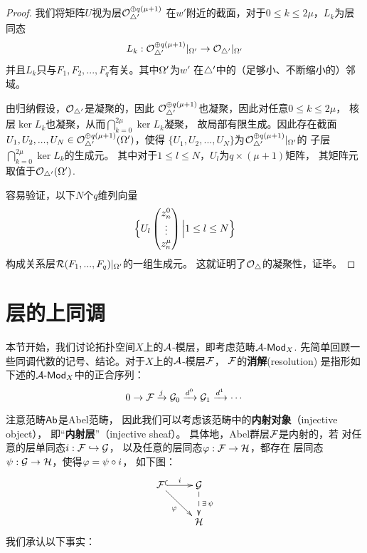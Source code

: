 \begin{proof}
我们将矩阵$U$视为层$\mathcal{O}_{\triangle'}^{\oplus q(\mu+1)}$
在$w'$附近的截面，对于$0\leq k\leq2\mu$，$L_k$为层同态
$$
  L_k:\mathcal{O}_{\triangle'}^{\oplus q(\mu+1)}|_{\Omega'}
\to
  \mathcal{O}_{\triangle'}|_{\Omega'}
$$
并且$L_k$只与$F_1,F_2,...,F_q$有关。其中$\Omega'$为$w'$
在$\triangle'$中的（足够小、不断缩小的）邻域。\vs

由归纳假设，$\mathcal{O}_{\triangle'}$是凝聚的，因此
$\mathcal{O}_{\triangle'}^{\oplus q(\mu+1)}$也凝聚，因此对任意$0\leq k\leq 2\mu$，
核层$\ker L_k$也凝聚，从而$\bigcap\limits_{k=0}^{2\mu}\ker L_k$凝聚，
故局部有限生成。因此存在截面
$U_1,U_2,...,U_N\in\mathcal{O}_{\triangle'}^{\oplus q(\mu+1)}(\Omega')$，使得
$\{U_1,U_2,...,U_N\}$为$\mathcal{O}_{\triangle'}^{\oplus q(\mu+1)}|_{\Omega'}$的
子层$\bigcap\limits_{k=0}^{2\mu}\ker L_k$的生成元。
其中对于$1\leq l\leq N$，$U_l$为$q\times(\mu+1)$矩阵，
其矩阵元取值于$\mathcal{O}_{\triangle'}(\Omega')$.

容易验证，以下$N$个$q$维列向量
$$
  \Big\{ U_l
           \begin{pmatrix}
             z_n^0  \\
             \vdots \\
             z_n^\mu
           \end{pmatrix}
          \Big| 1\leq l\leq N \Big\}
$$
构成关系层$\mathcal{R}(F_1,...,F_q)|_{\Omega'}$的一组生成元。
这就证明了$\mathcal{O}_{\triangle}$的凝聚性，证毕。
\end{proof}


\section{层的上同调}

本节开始，我们讨论拓扑空间$X$上的$\mathcal{A}$-模层，即考虑范畴$\mathcal{A}\operatorname{\!\text{-}\mathsf{Mod}}_X$.
先简单回顾一些同调代数的记号、结论。对于$X$上的$\mathcal{A}$-模层$\mathcal{F}$，
$\mathcal{F}$的\textbf{消解}(resolution)
是指形如下述的$\mathcal{A}\operatorname{\!\text{-}\mathsf{Mod}}_X$中的正合序列：
$$
0\to \mathcal{F}\xrightarrow{j}\mathcal{G}_0\xrightarrow{d^0}\mathcal{G}_1\xrightarrow{d^1}\cdots
$$

注意范畴$\operatorname{\mathsf{Ab}}$是Abel范畴，
因此我们可以考虑该范畴中的\textbf{内射对象}（injective object），
即“\textbf{内射层}”（injective sheaf）。
具体地，Abel群层$\mathcal{F}$是内射的，若
对任意的层单同态$i:\mathcal{F}\hookrightarrow\mathcal{G}$，
以及任意的层同态$\varphi:\mathcal{F}\to\mathcal{H}$，都存在
层同态$\psi:\mathcal{G}\to\mathcal{H}$，使得$\varphi=\psi\circ i$，
如下图：
$$
  \xymatrix{
     \mcalF
       \ar@{^(->}[r]^i
       \ar[rd]_{\fai}
    &\mcalG
       \ar@{-->}[d]^{\exists\,\psi}
  \\
    &\mcalH
  }
$$
我们承认以下事实：

